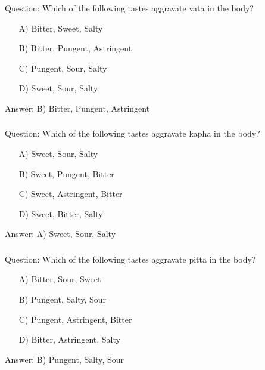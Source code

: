 \begin{frame}[fragile]\frametitle{}

Question: Which of the following tastes aggravate vata in the body?

\begin{itemize}
\item[A)] Bitter, Sweet, Salty
\item[B)] Bitter, Pungent, Astringent
\item[C)] Pungent, Sour, Salty
\item[D)] Sweet, Sour, Salty
\end{itemize}

Answer: B) Bitter, Pungent, Astringent
\end{frame}

\begin{frame}[fragile]\frametitle{}

Question: Which of the following tastes aggravate kapha in the body?

\begin{itemize}
\item[A)] Sweet, Sour, Salty
\item[B)] Sweet, Pungent, Bitter
\item[C)] Sweet, Astringent, Bitter
\item[D)] Sweet, Bitter, Salty
\end{itemize}

Answer: A) Sweet, Sour, Salty
\end{frame}

\begin{frame}[fragile]\frametitle{}

Question: Which of the following tastes aggravate pitta in the body?

\begin{itemize}
\item[A)] Bitter, Sour, Sweet
\item[B)] Pungent, Salty, Sour
\item[C)] Pungent, Astringent, Bitter
\item[D)] Bitter, Astringent, Salty
\end{itemize}

Answer: B) Pungent, Salty, Sour
\end{frame}

